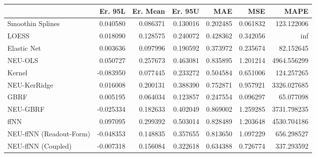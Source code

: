 \begin{tabular}{lrrrrrr}
\toprule
{} &   Er. 95L &  Er. Mean &   Er. 95U &       MAE &       MSE &         MAPE \\
\midrule
Smoothin Splines        &  0.040580 &  0.086371 &  0.130016 &  0.202485 &  0.061832 &   123.122006 \\
LOESS                   &  0.018090 &  0.128575 &  0.240072 &  0.428362 &  0.342056 &          inf \\
Elastic Net             &  0.003636 &  0.097996 &  0.190592 &  0.373972 &  0.235674 &    82.152645 \\
NEU-OLS                 &  0.050727 &  0.257673 &  0.463081 &  0.835895 &  1.201214 &  4964.556299 \\
Kernel                  & -0.083950 &  0.077445 &  0.233272 &  0.504584 &  0.651006 &   124.257265 \\
NEU-KerRidge            &  0.016008 &  0.200131 &  0.388390 &  0.752871 &  0.957921 &  3326.027685 \\
GBRF                    &  0.005195 &  0.064034 &  0.123857 &  0.247554 &  0.096297 &    65.077098 \\
NEU-GBRF                & -0.025334 &  0.182633 &  0.402049 &  0.869002 &  1.259285 &  3731.798235 \\
ffNN                    &  0.097095 &  0.299392 &  0.503014 &  0.828489 &  1.203648 &  4530.704186 \\
NEU-ffNN (Readout-Form) & -0.048353 &  0.148835 &  0.357655 &  0.813650 &  1.097229 &   656.298527 \\
NEU-ffNN (Coupled)      & -0.007318 &  0.156084 &  0.322618 &  0.634388 &  0.726774 &   337.293592 \\
\bottomrule
\end{tabular}
